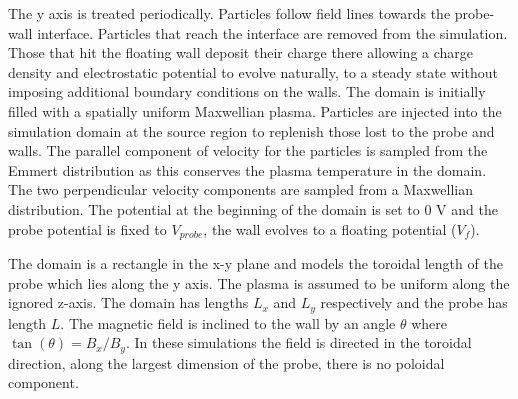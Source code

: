 The y axis is treated periodically. Particles follow field lines towards the probe-wall interface. Particles that reach the interface are removed from the simulation. Those that hit the floating wall deposit their charge there allowing a charge density and electrostatic potential to evolve naturally, to a steady state without imposing additional boundary conditions on the walls. The domain is initially filled with a spatially uniform Maxwellian plasma. Particles are injected into the simulation domain at the source region to replenish those lost to the probe and walls. The parallel component of velocity for the particles is sampled from the Emmert distribution \cite{Emmert} as this conserves the plasma temperature in the domain. The two perpendicular velocity components are sampled from a Maxwellian distribution. The potential at the beginning of the domain is set to 0 V and the probe potential is fixed to $V_{probe}$, the wall evolves to a floating potential ($V_f$).   

The domain is a rectangle in the x-y plane and models the toroidal length of the probe which lies along the y axis. The plasma is assumed to be uniform along the ignored z-axis. The domain has lengths $L_x$ and $L_y$ respectively and the probe has length $L$. The magnetic field is inclined to the wall by an angle $\theta$ where  $\tan(\theta) = B_x/B_y$. In these simulations the field is directed in the toroidal direction, along the largest dimension of the probe, there is no poloidal component.


